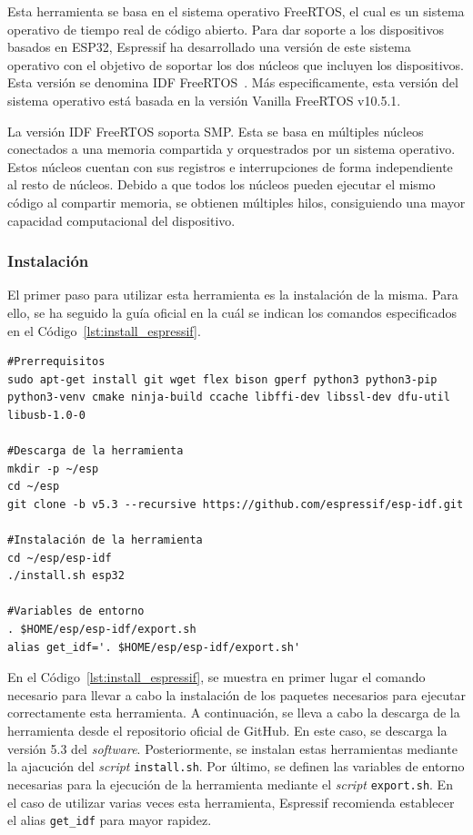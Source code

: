 Esta herramienta se basa en el sistema operativo \ac{FreeRTOS}, el cual es un sistema operativo de tiempo real de código abierto.
Para dar soporte a los dispositivos basados en ESP32, Espressif ha desarrollado una versión de este sistema operativo con el objetivo de soportar los dos núcleos que incluyen los dispositivos.
Esta versión se denomina IDF FreeRTOS~\cite{idf-freertos}.
Más especificamente, esta versión del sistema operativo está basada en la versión Vanilla FreeRTOS v10.5.1.

La versión IDF FreeRTOS soporta \ac{SMP}.
Esta se basa en múltiples núcleos conectados a una memoria compartida y orquestrados por un sistema operativo.
Estos núcleos cuentan con sus registros e interrupciones de forma independiente al resto de núcleos.
Debido a que todos los núcleos pueden ejecutar el mismo código al compartir memoria, se obtienen múltiples hilos, consiguiendo una mayor capacidad computacional del dispositivo.


\subsubsection{Instalación}\label{subsubsec:install_espressif}

El primer paso para utilizar esta herramienta es la instalación de la misma.
Para ello, se ha seguido la guía oficial en la cuál se indican los comandos especificados en el Código~\ref{lst:install_espressif}.

\begin{lstlisting}[label={lst:install_espressif},style=Bashnice,firstnumber=1,caption={Instalación de ESP-IDF~\cite{espressif-install}.}]
#Prerrequisitos
sudo apt-get install git wget flex bison gperf python3 python3-pip python3-venv cmake ninja-build ccache libffi-dev libssl-dev dfu-util libusb-1.0-0

#Descarga de la herramienta
mkdir -p ~/esp
cd ~/esp
git clone -b v5.3 --recursive https://github.com/espressif/esp-idf.git

#Instalación de la herramienta
cd ~/esp/esp-idf
./install.sh esp32

#Variables de entorno
. $HOME/esp/esp-idf/export.sh
alias get_idf='. $HOME/esp/esp-idf/export.sh'
\end{lstlisting}

En el Código~\ref{lst:install_espressif}, se muestra en primer lugar el comando necesario para llevar a cabo la instalación de los paquetes necesarios para ejecutar correctamente esta herramienta.
A continuación, se lleva a cabo la descarga de la herramienta desde el repositorio oficial de GitHub.
En este caso, se descarga la versión 5.3 del \textit{software}.
Posteriormente, se instalan estas herramientas mediante la ajacución del \textit{script} \texttt{install.sh}.
Por último, se definen las variables de entorno necesarias para la ejecución de la herramienta mediante el \textit{script} \texttt{export.sh}.
En el caso de utilizar varias veces esta herramienta, Espressif recomienda establecer el alias \texttt{get\_idf} para mayor rapidez.


